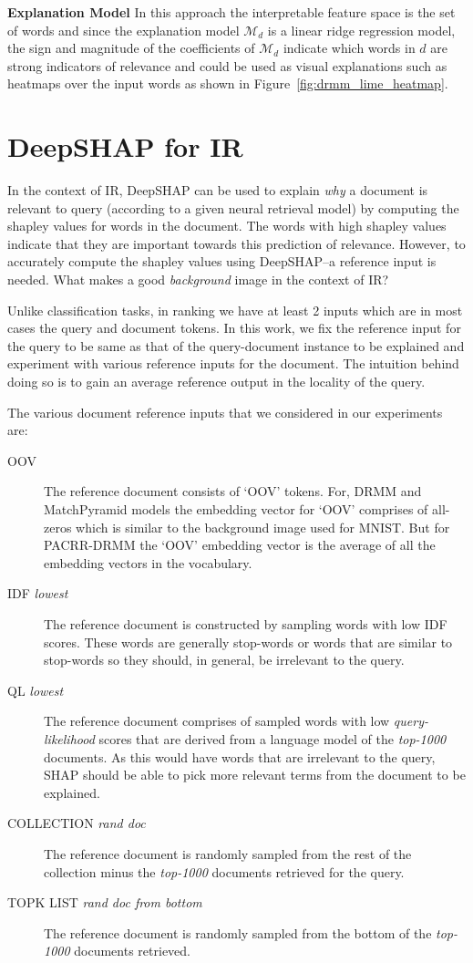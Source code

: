 \textbf{Explanation Model} In this approach the interpretable feature space is the set of words and since the explanation model $\mathcal{M}_{d}$ is a linear ridge regression model, the sign and magnitude of the coefficients of $\mathcal{M}_{d}$ indicate which words in $d$ are strong indicators of relevance and could be used as visual explanations such as heatmaps over the input words as shown in Figure~\ref{fig:drmm_lime_heatmap}.


\section{DeepSHAP for IR}\label{sec:deepshap_ir}

In the context of IR, DeepSHAP can be used to explain \textit{why} a document is relevant to query (according to a given neural retrieval model) by computing the shapley values for words in the document. The words with high shapley values indicate that they are important towards this prediction of relevance. However, to accurately compute the shapley values using DeepSHAP--a reference input is needed. What makes a good \textit{background} image in the context of IR? 

Unlike classification tasks, in ranking we have at least 2 inputs which are in most cases the query and document tokens. In this work, we fix the reference input for the query to be same as that of the query-document instance to be explained and experiment with various reference inputs for the document. The intuition behind doing so is to gain an average reference output in the locality of the query. 

The various document reference inputs that we considered in our experiments are:
\begin{description}
    \item[OOV] The reference document consists of `OOV' tokens. For, DRMM and MatchPyramid models the embedding vector for `OOV' comprises of all-zeros which is similar to the background image used for MNIST. But for PACRR-DRMM the `OOV' embedding vector is the average of all the embedding vectors in the vocabulary. 
    \item[IDF {\it lowest}] The reference document is constructed by sampling words with low IDF scores. These words are generally stop-words or words that are similar to stop-words so they should, in general, be irrelevant to the query. 
    \item[QL {\it lowest}] The reference document comprises of sampled words with low {\it query-likelihood} scores that are derived from a language model of the {\it top-1000} documents. As this would have words that are irrelevant to the query, SHAP should be able to pick more relevant terms from the document to be explained.
    \item[COLLECTION {\it rand doc}] The reference document is randomly sampled from the rest of the collection minus the {\it top-1000} documents retrieved for the query.
    \item[TOPK LIST {\it rand doc from bottom}] The reference document is randomly sampled from the bottom of the {\it top-1000} documents retrieved.
\end{description}

